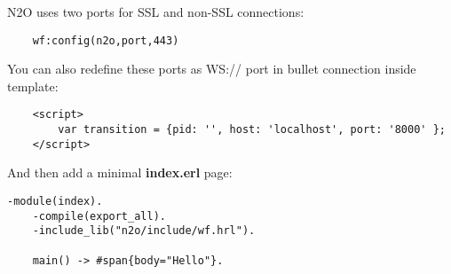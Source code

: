 N2O uses two ports for SSL and non-SSL connections: 

\vspace{1\baselineskip}
\begin{lstlisting}
    wf:config(n2o,port,443)
\end{lstlisting}
\vspace{1\baselineskip}

You can also redefine these ports as WS:// port in bullet connection inside template:

\vspace{1\baselineskip}
\begin{lstlisting}
    <script>
        var transition = {pid: '', host: 'localhost', port: '8000' };
    </script>
\end{lstlisting}
\vspace{1\baselineskip}

And then add a minimal {\bf index.erl} page:

\begin{lstlisting}[caption=index.erl]
    -module(index).
    -compile(export_all).
    -include_lib("n2o/include/wf.hrl").

    main() -> #span{body="Hello"}.
\end{lstlisting}

